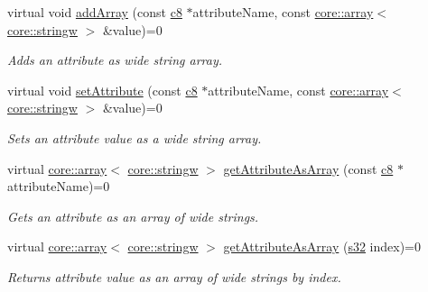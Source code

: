 \begin{DoxyCompactItemize}
virtual void \hyperlink{classirr_1_1io_1_1IAttributes_abbf204e53ef70b89fc25a98f01111031}{add\+Array} (const \hyperlink{namespaceirr_a9395eaea339bcb546b319e9c96bf7410}{c8} $\ast$attribute\+Name, const \hyperlink{classirr_1_1core_1_1array}{core\+::array}$<$ \hyperlink{namespaceirr_1_1core_a5aedb62cb47cf01d1c548ab5e6344d2d}{core\+::stringw} $>$ \&value)=0
\begin{DoxyCompactList}\small\item\em Adds an attribute as wide string array. \end{DoxyCompactList}\item 
virtual void \hyperlink{classirr_1_1io_1_1IAttributes_a95abee2c34c3a438ba0df22d339b806e}{set\+Attribute} (const \hyperlink{namespaceirr_a9395eaea339bcb546b319e9c96bf7410}{c8} $\ast$attribute\+Name, const \hyperlink{classirr_1_1core_1_1array}{core\+::array}$<$ \hyperlink{namespaceirr_1_1core_a5aedb62cb47cf01d1c548ab5e6344d2d}{core\+::stringw} $>$ \&value)=0
\begin{DoxyCompactList}\small\item\em Sets an attribute value as a wide string array. \end{DoxyCompactList}\item 
virtual \hyperlink{classirr_1_1core_1_1array}{core\+::array}$<$ \hyperlink{namespaceirr_1_1core_a5aedb62cb47cf01d1c548ab5e6344d2d}{core\+::stringw} $>$ \hyperlink{classirr_1_1io_1_1IAttributes_af4fb7e071a70bc0e9c57099bc04eda4f}{get\+Attribute\+As\+Array} (const \hyperlink{namespaceirr_a9395eaea339bcb546b319e9c96bf7410}{c8} $\ast$attribute\+Name)=0
\begin{DoxyCompactList}\small\item\em Gets an attribute as an array of wide strings. \end{DoxyCompactList}\item 
virtual \hyperlink{classirr_1_1core_1_1array}{core\+::array}$<$ \hyperlink{namespaceirr_1_1core_a5aedb62cb47cf01d1c548ab5e6344d2d}{core\+::stringw} $>$ \hyperlink{classirr_1_1io_1_1IAttributes_a78e6562bd6e45c24d10c8cf77e3b317a}{get\+Attribute\+As\+Array} (\hyperlink{namespaceirr_ac66849b7a6ed16e30ebede579f9b47c6}{s32} index)=0
\begin{DoxyCompactList}\small\item\em Returns attribute value as an array of wide strings by index. \end{DoxyCompactList}\item 
\mbox{\label{classirr_1_1io_1_1IAttributes_aa4e2e82c29e917cac49d92ac30628099}} 

\end{DoxyCompactItemize}
